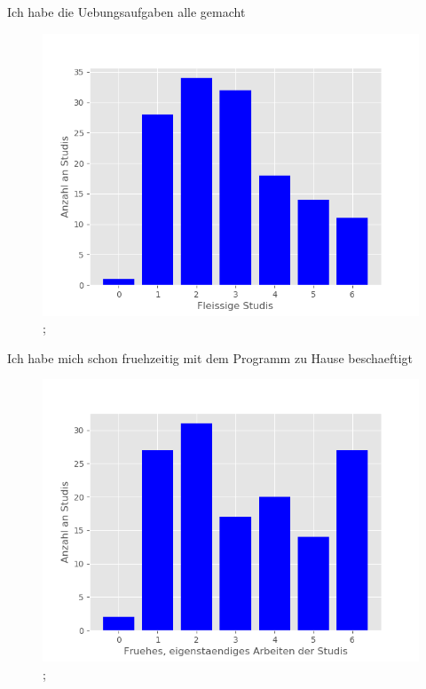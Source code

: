 \documentclass[10pt]{beamer}
\begin{document}
\begin{frame}[fragile]{Ich habe die Uebungsaufgaben alle gemacht} 
 \begin{figure}
 \includegraphics[width= 0.9\linewidth]{./PDFcreater/Plots/Ich+habe+die+Uebungsaufgaben+alle+gemacht.png};
 \end{figure}
 \end{frame}
\begin{frame}[fragile]{Ich habe mich schon fruehzeitig mit dem Programm zu Hause beschaeftigt} 
 \begin{figure}
 \includegraphics[width= 0.9\linewidth]{./PDFcreater/Plots/Ich+habe+mich+schon+fruehzeitig+mit+dem+Programm+zu+Hause+beschaeftigt.png};
 \end{figure}
 \end{frame}
\end{document}
